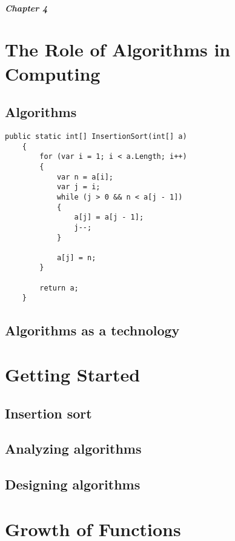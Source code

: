\documentclass[letterpaper]{book}
\begin{document}
	\paragraph{Chapter 4} 
	\Blindtext	

	\chapter{The Role of Algorithms in Computing}
	\section{Algorithms}

	\begin{lstlisting}[language={[Sharp]C}, caption={Insertion Sort}, label={Script}]
	public static int[] InsertionSort(int[] a)
	{
		for (var i = 1; i < a.Length; i++)
		{
			var n = a[i];
			var j = i;
			while (j > 0 && n < a[j - 1])
			{
				a[j] = a[j - 1];
				j--;
			}

			a[j] = n;
		}

		return a;
	}
	\end{lstlisting}

	\Blindtext
	\newpage

	\section{Algorithms as a technology}
	\Blindtext
	\newpage

	\chapter{Getting Started}
	\section{Insertion sort}
	\Blindtext
	\newpage

	\section{Analyzing algorithms}
	\Blindtext
	\newpage

	\section{Designing algorithms}
	\Blindtext
	\newpage

	\chapter{Growth of Functions}
\end{document}
